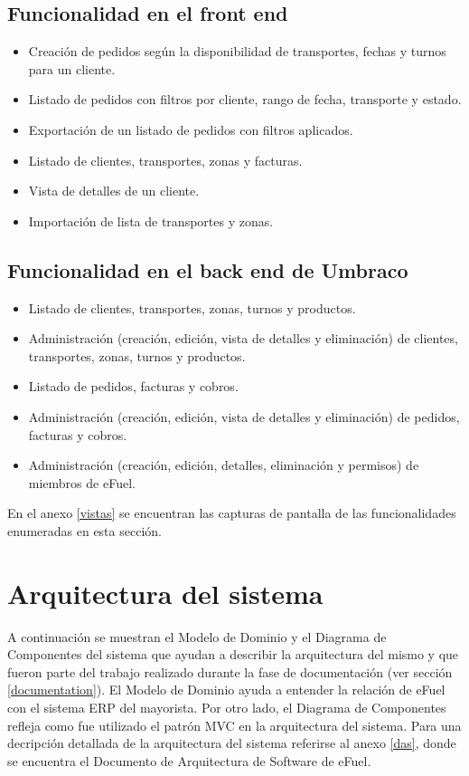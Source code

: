 \subsection{Funcionalidad en el front end}
\begin{itemize}
    \item Creación de pedidos según la disponibilidad de transportes, fechas y turnos para un cliente.
    \item Listado de pedidos con filtros por cliente, rango de fecha, transporte y estado.
    \item Exportación de un listado de pedidos con filtros aplicados.
    \item Listado de clientes, transportes, zonas y facturas.
    \item Vista de detalles de un cliente.
    \item Importación de lista de transportes y zonas.
\end{itemize}

\subsection{Funcionalidad en el back end de Umbraco}
\begin{itemize}
    \item Listado de clientes, transportes, zonas, turnos y productos.
    \item Administración (creación, edición, vista de detalles y eliminación) de clientes, transportes, zonas, turnos y productos.
    \item Listado de pedidos, facturas y cobros.
    \item Administración (creación, edición, vista de detalles y eliminación) de pedidos, facturas y cobros.
    \item Administración (creación, edición, detalles, eliminación y permisos) de miembros de eFuel.
\end{itemize}

En el anexo \ref{vistas} se encuentran las capturas de pantalla de las funcionalidades enumeradas en esta sección.

\section{Arquitectura del sistema}
A continuación se muestran el Modelo de Dominio y el Diagrama de Componentes del sistema que ayudan a describir la arquitectura del mismo y que fueron parte del trabajo realizado durante la fase de documentación (ver sección \ref{documentation}). El Modelo de Dominio ayuda a entender la relación de eFuel con el sistema ERP del mayorista. Por otro lado, el Diagrama de Componentes refleja como fue utilizado el patrón MVC en la arquitectura del sistema. Para una decripción detallada de la arquitectura del sistema referirse al anexo \ref{das}, donde se encuentra el Documento de Arquitectura de Software de eFuel.

